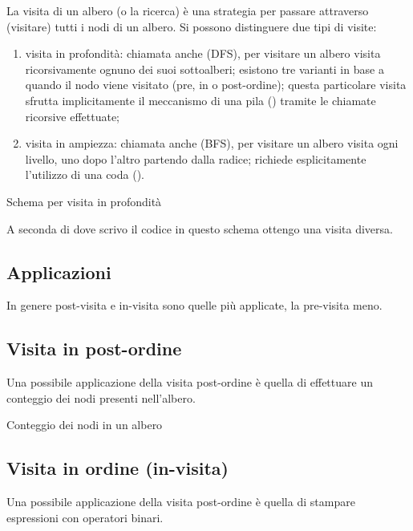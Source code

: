 La visita di un albero (o la ricerca) è una strategia per passare attraverso (visitare) tutti i nodi di un albero.
Si possono distinguere due tipi di visite:
\begin{enumerate}
	\item visita in profondità: chiamata anche  (DFS), per visitare un albero visita ricorsivamente ognuno dei suoi sottoalberi; esistono tre varianti in base a quando il nodo viene visitato (pre, in o post-ordine); questa particolare visita sfrutta implicitamente il meccanismo di una pila () tramite le chiamate ricorsive effettuate;
	\item visita in ampiezza: chiamata anche  (BFS), per visitare un albero visita ogni livello, uno dopo l'altro partendo dalla radice; richiede esplicitamente l'utilizzo di una coda ().
\end{enumerate}

\begin{algorithm}[H]
	\caption{Schema per visita in profondità}
	
\end{algorithm}

A seconda di dove scrivo il codice in questo schema ottengo una visita diversa.

\clearpage
\subsection{Applicazioni}

In genere post-visita e in-visita sono quelle più applicate, la pre-visita meno.

\subsection*{Visita in post-ordine}

Una possibile applicazione della visita post-ordine è quella di effettuare un conteggio dei nodi presenti nell'albero.

\begin{algorithm}[H]
	\caption{Conteggio dei nodi in un albero}
	
\end{algorithm}

\subsection*{Visita in ordine (in-visita)}

Una possibile applicazione della visita post-ordine è quella di stampare espressioni con operatori binari.

